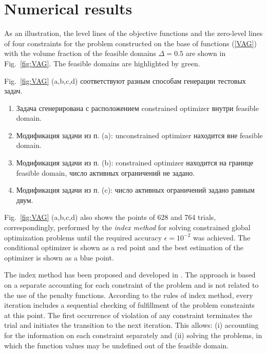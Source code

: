 \documentclass{aip-cp}
\begin{document}
\section{Numerical results}

As an illustration, the level lines of the objective functions and the zero-level lines of four constraints for the problem constructed on the base of functions (\ref{VAG}) with the volume fraction of the feasible domains $\Delta = 0.5$ are shown in Fig.~\ref{fig:VAG}. The feasible domains are highlighted by green. 

Fig.~\ref{fig:VAG} (a,b,c,d) соответствуют разным способам генерации тестовых задач.
\begin{enumerate}[label=(\alph*)]
	\item Задача сгенерирована с расположением constrained optimizer внутри feasible domain.
	\item Модификация задачи из п. (a): unconstrained optimizer находится вне feasible domain.
	\item Модификация задачи из п. (b): constrained optimizer находится на границе feasible domain, число активных ограничений не задано.
	\item Модификация задачи из п. (c): число активных ограничений задано равным двум.
\end{enumerate}

Fig.~\ref{fig:VAG} (a,b,c,d) also shows the points of 628 and 764 trials, correspondingly, performed by the \textit{index method} for solving constrained global optimization problems until the required accuracy $\epsilon=10^{-2}$ was achieved. The conditional optimizer is shown as a red point and the best estimation of the optimizer is shown as a blue point.

The index method has been proposed and developed in \cite{Strongin2000,Sergeyev2001,Barkalov2002}. The approach is based on a separate accounting for each constraint of the problem and is not related to the use of the penalty functions. According to the rules of index method, every iteration includes a sequential checking of fulfillment of the problem constraints at this point. The first occurrence of violation of any constraint terminates the trial and initiates the transition to the next iteration. This allows: (i) accounting for the information on each constraint separately and (ii) solving the problems, in which the function values may be undefined out of the feasible domain. 
\end{document}
